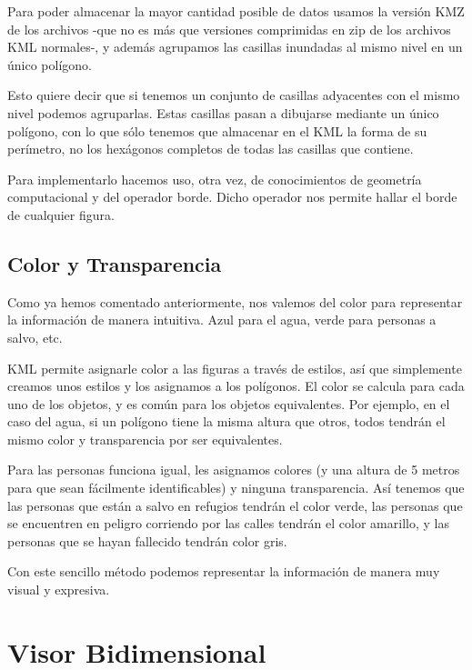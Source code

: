Para poder almacenar la mayor cantidad posible de datos usamos la versión KMZ
de los archivos -que no es más que versiones comprimidas en zip de los
archivos KML normales-, y además agrupamos las casillas inundadas al mismo
nivel en un único polígono.

Esto quiere decir que si tenemos un conjunto de casillas adyacentes con el
mismo nivel podemos agruparlas. Estas casillas pasan a dibujarse mediante un
único polígono, con lo que sólo tenemos que almacenar en el KML la forma de su
perímetro, no los hexágonos completos de todas las casillas que contiene.

Para implementarlo hacemos uso, otra vez, de conocimientos de geometría
computacional y del operador borde. Dicho operador nos permite hallar el
borde de cualquier figura.



\subsection*{Color y Transparencia}

Como ya hemos comentado anteriormente, nos valemos del color para representar
la información de manera intuitiva. Azul para el agua, verde para personas a
salvo, etc.

KML permite asignarle color a las figuras a través de estilos, así que
simplemente creamos unos estilos y los asignamos a los polígonos. El color se
calcula para cada uno de los objetos, y es común para los objetos equivalentes.
Por ejemplo, en el caso del agua, si un polígono tiene la misma altura que
otros, todos tendrán el mismo color y transparencia por ser equivalentes.

Para las personas funciona igual, les asignamos colores (y una altura de 5
metros para que sean fácilmente identificables) y ninguna transparencia. Así
tenemos que las personas que están a salvo en refugios tendrán el color verde,
las personas que se encuentren en peligro corriendo por las calles tendrán el
color amarillo, y las personas que se hayan fallecido tendrán color gris.

Con este sencillo método podemos representar la información de manera muy
visual y expresiva.

\section*{Visor Bidimensional}

